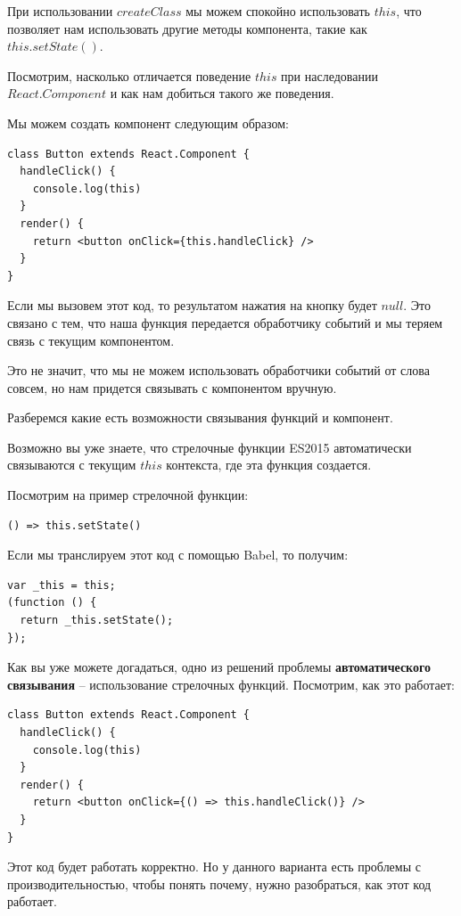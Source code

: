При использовании $createClass$ мы можем спокойно использовать $this$, что позволяет нам использовать другие методы компонента, такие как $this.setState()$. 

Посмотрим, насколько отличается поведение $this$ при наследовании $React.Component$ и как нам добиться такого же поведения. 

Мы можем создать компонент следующим образом:

\begin{lstlisting}
class Button extends React.Component {
  handleClick() {
    console.log(this)
  }
  render() {
    return <button onClick={this.handleClick} />
  } 
}
\end{lstlisting}

Если мы вызовем этот код, то результатом нажатия на кнопку будет $null$. Это связано с тем, что наша функция передается обработчику событий и мы теряем связь с текущим компонентом.

Это не значит, что мы не можем использовать обработчики событий от слова совсем, но нам придется связывать с компонентом вручную.

Разберемся какие есть возможности связывания функций и компонент.

Возможно вы уже знаете, что стрелочные функции ES2015 автоматически связываются с текущим $this$ контекста, где эта функция создается.

Посмотрим на пример стрелочной функции:

\begin{lstlisting}
() => this.setState()
\end{lstlisting}

Если мы транслируем этот код с помощью Babel, то получим:

\begin{lstlisting}
var _this = this;
(function () {
  return _this.setState();
});
\end{lstlisting}

Как вы уже можете догадаться, одно из решений проблемы \textbf{автоматического связывания} -- использование стрелочных функций. Посмотрим, как это работает:

\begin{lstlisting}
class Button extends React.Component {
  handleClick() {
    console.log(this)
  }
  render() {
    return <button onClick={() => this.handleClick()} />
  } 
}
\end{lstlisting}

Этот код будет работать корректно. Но у данного варианта есть проблемы с производительностью, чтобы понять почему, нужно разобраться, как этот код работает.

